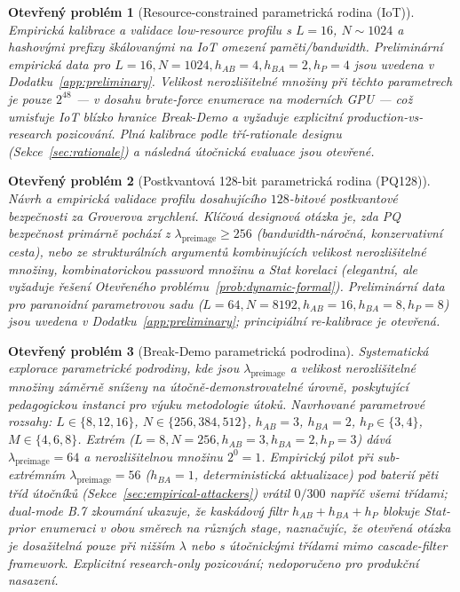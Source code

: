 \documentclass[11pt,a4paper]{article}
\newtheorem{openproblem}{Otev\v{r}en\'y probl\'em}
\begin{document}
\begin{openproblem}[Resource-constrained parametrická rodina (IoT)]\label{prob:iot}
Empirická kalibrace a validace low-resource profilu s $L = 16$, $N \sim 1024$ a hashovými prefixy škálovanými na IoT omezení paměti/bandwidth. Preliminární empirická data pro $L = 16, N = 1024, h_{AB} = 4, h_{BA} = 2, h_P = 4$ jsou uvedena v Dodatku~\ref{app:preliminary}. Velikost nerozlišitelné množiny při těchto parametrech je pouze $2^{48}$ --- v dosahu brute-force enumerace na moderních GPU --- což umisťuje IoT blízko hranice Break-Demo a vyžaduje explicitní production-vs-research pozicování. Plná kalibrace podle tří-rationale designu (Sekce~\ref{sec:rationale}) a následná útočnická evaluace jsou otevřené.
\end{openproblem}

\begin{openproblem}[Postkvantová 128-bit parametrická rodina (PQ128)]\label{prob:pq128}
Návrh a empirická validace profilu dosahujícího $128$-bitové postkvantové bezpečnosti za Groverova zrychlení. Klíčová designová otázka je, zda PQ bezpečnost primárně pochází z $\lambda_\text{preimage} \geq 256$ (bandwidth-náročná, konzervativní cesta), nebo ze strukturálních argumentů kombinujících velikost nerozlišitelné množiny, kombinatorickou password množinu a Stat korelaci (elegantní, ale vyžaduje řešení Otevřeného problému~\ref{prob:dynamic-formal}). Preliminární data pro paranoidní parametrovou sadu ($L = 64, N = 8192, h_{AB} = 16, h_{BA} = 8, h_P = 8$) jsou uvedena v Dodatku~\ref{app:preliminary}; principiální re-kalibrace je otevřená.
\end{openproblem}

\begin{openproblem}[Break-Demo parametrická podrodina]\label{prob:breakdemo}
Systematická explorace parametrické podrodiny, kde jsou $\lambda_\text{preimage}$ a velikost nerozlišitelné množiny záměrně sníženy na útočně-demonstrovatelné úrovně, poskytující pedagogickou instanci pro výuku metodologie útoků. Navrhované parametrové rozsahy: $L \in \{8, 12, 16\}$, $N \in \{256, 384, 512\}$, $h_{AB} = 3$, $h_{BA} = 2$, $h_P \in \{3, 4\}$, $M \in \{4, 6, 8\}$. Extrém ($L = 8, N = 256, h_{AB} = 3, h_{BA} = 2, h_P = 3$) dává $\lambda_\text{preimage} = 64$ a nerozlišitelnou množinu $2^{0} = 1$. Empirický pilot při sub-extrémním $\lambda_\text{preimage} = 56$ ($h_{BA} = 1$, deterministická aktualizace) pod baterií pěti tříd útočníků (Sekce~\ref{sec:empirical-attackers}) vrátil $0/300$ napříč všemi třídami; dual-mode B.7 zkoumání ukazuje, že kaskádový filtr $h_{AB}+h_{BA}+h_P$ blokuje Stat-prior enumeraci v obou směrech na různých stage, naznačujíc, že otevřená otázka je dosažitelná pouze při nižším $\lambda$ nebo s útočnickými třídami mimo cascade-filter framework. Explicitní research-only pozicování; nedoporučeno pro produkční nasazení.
\end{openproblem}
\end{document}
